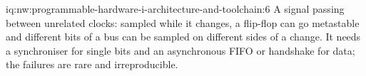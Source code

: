 \begin{solution}{iq:nw:programmable-hardware-i-architecture-and-toolchain:6}
A signal passing between unrelated clocks: sampled while it changes, a flip-flop can go metastable and different bits of a bus can be
sampled on different sides of a change. It needs a synchroniser for single bits and an asynchronous FIFO or handshake for data; the failures
are rare and irreproducible.
\end{solution}
